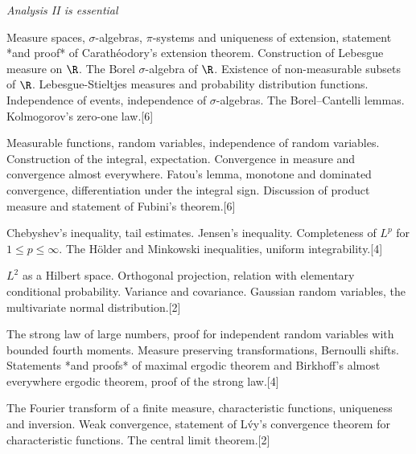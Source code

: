 \documentclass[a4paper]{article}
\begin{document}
\maketitle
{\small
\noindent\emph{Analysis II is essential}
\vspace{10pt}

\noindent Measure spaces, $\sigma$-algebras, $\pi$-systems and uniqueness of extension, statement *and proof* of Carath\'eodory's extension theorem. Construction of Lebesgue measure on $\R$. The Borel $\sigma$-algebra of $\R$. Existence of non-measurable subsets of $\R$. Lebesgue-Stieltjes measures and probability distribution functions. Independence of events, independence of $\sigma$-algebras. The Borel--Cantelli lemmas. Kolmogorov's zero-one law.\hspace*{\fill}[6]

\vspace{5pt}
\noindent Measurable functions, random variables, independence of random variables. Construction of the integral, expectation. Convergence in measure and convergence almost everywhere. Fatou's lemma, monotone and dominated convergence, differentiation under the integral sign. Discussion of product measure and statement of Fubini's theorem.\hspace*{\fill}[6]

\vspace{5pt}
\noindent Chebyshev's inequality, tail estimates. Jensen's inequality. Completeness of $L^p$ for $1 \leq p \leq \infty$. The H\"older and Minkowski inequalities, uniform integrability.\hspace*{\fill}[4]

\vspace{5pt}
\noindent $L^2$ as a Hilbert space. Orthogonal projection, relation with elementary conditional probability. Variance and covariance. Gaussian random variables, the multivariate normal distribution.\hspace*{\fill}[2]

\vspace{5pt}
\noindent The strong law of large numbers, proof for independent random variables with bounded fourth moments. Measure preserving transformations, Bernoulli shifts. Statements *and proofs* of maximal ergodic theorem and Birkhoff's almost everywhere ergodic theorem, proof of the strong law.\hspace*{\fill}[4]

\vspace{5pt}
\noindent The Fourier transform of a finite measure, characteristic functions, uniqueness and inversion. Weak convergence, statement of L\'vy's convergence theorem for characteristic functions. The central limit theorem.\hspace*{\fill}[2]%
}
\end{document}
